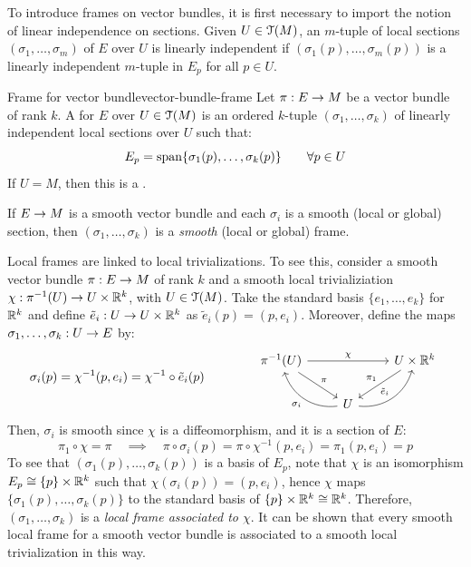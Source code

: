 To introduce frames on vector bundles, it is first necessary to import the notion of linear independence on sections. Given $ U \in \EuScript{T}(M) $, an $ m $-tuple of local sections $ (\sigma_1 , \dots , \sigma_m) $ of $ E $ over $ U $ is linearly independent if $ (\sigma_1(p) , \dots , \sigma_m(p)) $ is a linearly independent $ m $-tuple in $ E_p $ for all $ p \in U $.

\begin{definition}{Frame for vector bundle}{vector-bundle-frame}
  Let $ \pi : E \rightarrow M $ be a vector bundle of rank $ k $. A  for $ E $ over $ U \in \EuScript{T}(M) $ is an ordered $ k $-tuple $ (\sigma_1 , \dots , \sigma_k) $ of linearly independent local sections over $ U $ such that:
  \begin{equation*}
    E_p = \operatorname{span} \{\sigma_1(p) , \dots , \sigma_k(p)\}
    \qquad
    \forall p \in U
  \end{equation*}
  If $ U = M $, then this is a .
\end{definition}

If $ E \rightarrow M $ is a smooth vector bundle and each $ \sigma_i $ is a smooth (local or global) section, then $ (\sigma_1 , \dots , \sigma_k) $ is a \emph{smooth} (local or global) frame.

Local frames are linked to local trivializations. To see this, consider a smooth vector bundle $ \pi : E \rightarrow M $ of rank $ k $ and a smooth local trivializiation $ \chi : \pi^{-1}(U) \rightarrow U \times \mathbb{R}^k $, with $ U \in \EuScript{T}(M) $. Take the standard basis $ \{e_1 , \dots , e_k\} $ for $ \mathbb{R}^k $ and define $ \tilde{e}_i : U \rightarrow U \times \mathbb{R}^k $ as $ \tilde{e}_i(p) = (p , e_i) $. Moreover, define the maps $ \sigma_1 , \dots , \sigma_k : U \rightarrow E $ by:
\begin{equation*}
  \sigma_i(p) = \chi^{-1}(p,e_i) = \chi^{-1} \circ \tilde{e}_i(p)
  \qquad \qquad
  \begin{tikzcd}
    \pi^{-1}(U) \ar[rr , "\chi"] \ar[dr , "\pi"] & & U \times \R^k \ar[dl , "\pi_1" , swap] \\
                                                 & U \ar[ul, "\sigma_i", bend left = 40] \ar[ur, "\tilde{e}_i", bend right = 40] &
  \end{tikzcd}
\end{equation*}
Then, $ \sigma_i $ is smooth since $ \chi $ is a diffeomorphism, and it is a section of $ E $:
\begin{equation*}
  \pi_1 \circ \chi = \pi
  \quad \implies \quad
  \pi \circ \sigma_i(p) = \pi \circ \chi^{-1}(p , e_i) = \pi_1(p , e_i) = p
\end{equation*}
To see that $ (\sigma_1(p) , \dots , \sigma_k(p)) $ is a basis of $ E_p $, note that $ \chi $ is an isomorphism $ E_p \cong \{p\} \times \mathbb{R}^k $ such that $ \chi(\sigma_i(p)) = (p , e_i) $, hence $ \chi $ maps $ \{\sigma_1(p) , \dots , \sigma_k(p)\} $ to the standard basis of $ \{p\} \times \mathbb{R}^k \cong \mathbb{R}^k $. Therefore, $ (\sigma_1 , \dots , \sigma_k) $ is a \emph{local frame associated to $ \chi $}. It can be shown that every smooth local frame for a smooth vector bundle is associated to a smooth local trivialization in this way.


